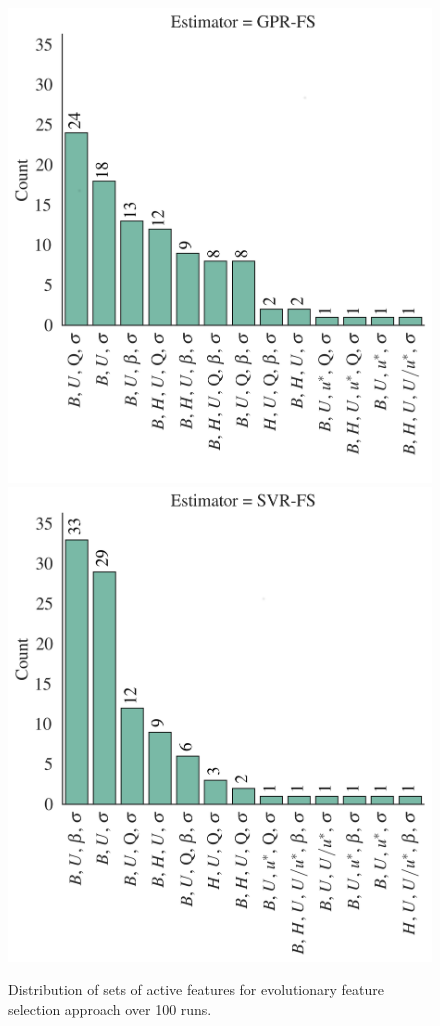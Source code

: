 \documentclass[a4paper,12pt, english]{article}
\begin{document}
\begin{figure}[!htb]
    \centering 
    \includegraphics[height=0.41\textheight]{./results/eml____300dpi_active_features_sets_gpr_fs__count}
    \includegraphics[height=0.41\textheight]{./results/eml____300dpi_active_features_sets_svr_fs__count}
    \caption{\label{fig:eml____300dpi_active_features_sets_count}
    Distribution of sets of  active features for evolutionary feature selection approach over 100 runs.}
\end{figure} 
\end{document}
